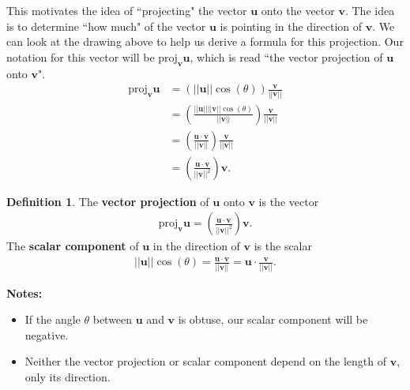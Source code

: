 \documentclass[12pt, letter]{article}
\theoremstyle{plain}
\numberwithin{theorem}{section}
\theoremstyle{definition}
\newtheorem{definition}[theorem]{Definition}
\begin{document}
\bigskip

This motivates the idea of ``projecting" the vector $\bm{u}$ onto the vector $\bm{v}$. The idea is to determine ``how much" of the vector $\bm{u}$ is pointing in the direction of $\bm{v}$. We can look at the drawing above to help us derive a formula for this projection. Our notation for this vector will be $\text{proj}_{\bm{v}} \bm{u}$, which is read ``the vector projection of $\bm{u}$ onto $\bm{v}$".
\begin{align*}
\text{proj}_{\bm{v}} \bm{u} &= \left(||\bm{u}|| \cos(\theta)\right) \frac{\bm{v}}{||\bm{v}||}\\
&= \left(\frac{||\bm{u}|| ||\bm{v}|| \cos(\theta)}{||\bm{v}||} \right) \frac{\bm{v}}{||\bm{v}||}\\
&= \left( \frac{\bm{u}\cdot\bm{v}}{||\bm{v}||} \right) \frac{\bm{v}}{||\bm{v}||}\\
&= \left(\frac{\bm{u}\cdot\bm{v}}{||\bm{v}||^2}\right)\bm{v}.
\end{align*}

\bigskip

\hrulefill

\bigskip

\begin{definition}
The \textbf{vector projection} of $\bm{u}$ onto $\bm{v}$ is the vector
\begin{align*}
\text{proj}_{\bm{v}} \bm{u} = \left(\frac{\bm{u}\cdot\bm{v}}{||\bm{v}||^2}\right)\bm{v}.
\end{align*}
The \textbf{scalar component} of $\bm{u}$ in the direction of $\bm{v}$ is the scalar
\begin{align*}
||\bm{u}||\cos(\theta) = \frac{\bm{u}\cdot\bm{v}}{||\bm{v}||} = \bm{u} \cdot \frac{\bm{v}}{||\bm{v}||}.
\end{align*}
\end{definition}

\bigskip

\textbf{Notes:}
\begin{itemize}
\item If the angle $\theta$ between $\bm{u}$ and $\bm{v}$ is obtuse, our scalar component will be negative.
\item Neither the vector projection or scalar component depend on the length of $\bm{v}$, only its direction.
\end{itemize}

\bigskip

\hrulefill

\bigskip
\end{document}
